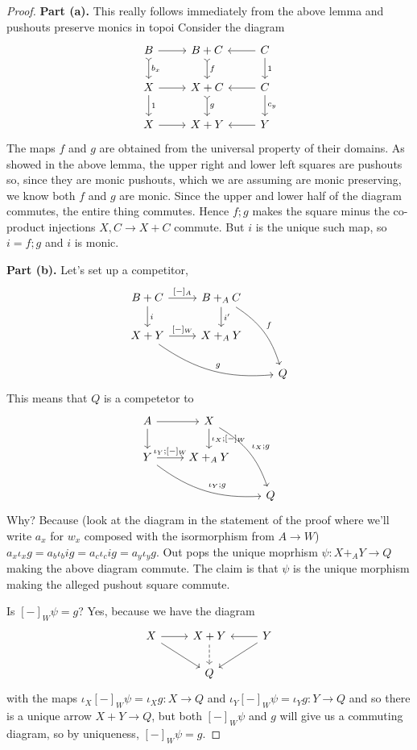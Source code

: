 \documentclass[12pt]{article}
\newcommand{\from}{\colon}
\renewcommand{\(}{\left(}
\renewcommand{\)}{\right)}
\renewcommand{\{}{\left\lbrace}
\renewcommand{\}}{\right\rbrace}
\theoremstyle{remark}
\theoremstyle{definition}
\begin{document}
 \begin{proof}
 	\textbf{Part (a).} {\color{red} This really follows immediately from the above lemma and pushouts preserve monics in topoi} Consider the diagram
 	\[
 	\begin{tikzcd}
 	{B} \ar[d, rightarrowtail,"b_x"] \ar[r] &
 	{B+C} \ar[d,rightarrowtail,"f"] &
 	{C} \ar[l] \ar[d,"1"]\\
 	{X} \ar[r] \ar[d,"1"] &
 	{X+C} \ar[d,rightarrowtail,"g"]&
 	{C} \ar[l] \ar[d,"c_y"] \\
 	{X} \ar[r]  &
 	{X+Y} &
 	{Y} \ar[l]
 	\end{tikzcd}
 	\] 	
 	The maps $f$ and $g$ are obtained from the universal property of their domains.  As 
 	showed in the above lemma, the upper right and lower left squares are pushouts so, 
 	since they are monic pushouts, which we are assuming are monic preserving, we know both 
 	$f$ and $g$ are monic. Since the upper and lower half of the diagram commutes, the 
 	entire thing commutes.  Hence $f;g$ makes the square minus the co-product injections 
 	$X,C \to X+C$ commute. But $i$ is the unique such map, so $i=f;g$ and $i$ is monic.  
 	
 	\textbf{Part (b).} Let's set up a competitor,
 	\[
 	\begin{tikzcd}
 	{B+C} \ar[r,"{[-]_A}"] \ar[d,"i"] &
 	{B+_AC} \ar[d,"i'"] \ar[ddr,bend left=20,"f"]&
 	{} \\
 	{X+Y} \ar[r,"{[-]_W}"] \ar[drr,bend right=20,"g"]&
 	{X+_AY} &
 	{} \\
 	{} &
 	{} &
 	{Q}
 	\end{tikzcd}
 	\]
 	This means that $Q$ is a competetor to
 	\[
 	\begin{tikzcd}
 	{A} \ar[r] \ar[d] &
 	{X} \ar[d,"{\iota_X;[-]_W}"] \ar[ddr,bend left=20,"\iota_X;g"]&
 	{} \\
 	{Y} \ar[r,"{\iota_Y;[-]_W}"] \ar[drr,bend right=20,"\iota_Y;g"]&
 	{X+_AY} &
 	{} \\
 	{} &
 	{} &
 	{Q}
 	\end{tikzcd}
 	\]
 	Why? Because (look at the diagram in the statement of the proof where we'll write $a_x$ 
 	for $w_x$ composed with the isormorphism from $A \to W$) $a_x\iota_xg= a_b\iota_big = 
 	a_c\iota_cig=a_y\iota_yg$. Out pops the unique moprhism $\psi \from X+_AY \to Q$ making 
 	the above diagram commute.  The claim is that $\psi$ is the unique morphism making the 
 	alleged pushout square commute.  
 	
 	Is $[-]_W \psi = g$?  Yes, because we have the diagram
 	\[
 	\begin{tikzcd}
 	{X} \ar[r] \ar[dr] &
 	{X+Y} \ar[d,dashed] &
 	{Y} \ar[l] \ar[dl]\\
 	{} &
 	{Q} &
 	{}
 	\end{tikzcd}
 	\]
 	with the maps $\iota_X[-]_W\psi = \iota_X g \from X \to Q$ and $\iota_Y[-]_W\psi = 
 	\iota_Y g \from Y \to Q$ and so there is a unique arrow $X+Y \to Q$, but both 
 	$[-]_W\psi$ and $g$ will give us a commuting diagram, so by uniqueness, $[-]_W\psi=g$.  
 	

\end{proof}
\end{document}
